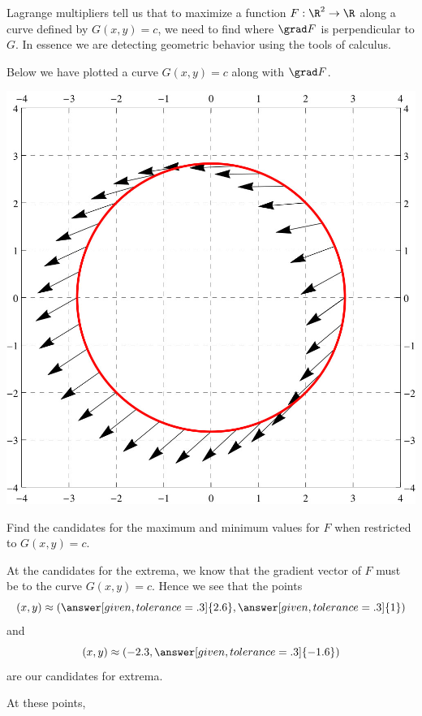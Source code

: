 \documentclass{ximera}
\begin{document}
Lagrange multipliers tell us that to maximize a function $F:\R^2\to\R$
along a curve defined by $G(x,y) = c$, we need to find where $\grad F$
is perpendicular to $G$. In essence we are detecting geometric
behavior using the tools of calculus.

\begin{example}
  Below we have plotted a curve $G(x,y) = c$ along with $\grad F$.
  \begin{image}
    \includegraphics{curveVectors2.jpg}
  \end{image}
  Find the candidates for the maximum and minimum values for $F$ when
  restricted to $G(x,y) = c$.
  \begin{explanation}
    At the candidates for the extrema, we know that the gradient
    vector of $F$ must be
     to
    the curve $G(x,y) = c$. Hence we see that the points
    \[
    (x,y)\approx\left(\answer[given,tolerance=.3]{2.6},\answer[given,tolerance=.3]{1}\right)
    \]
    and
    \[
    (x,y)\approx \left(-2.3,\answer[given,tolerance=.3]{-1.6}\right)
    \]
    are our candidates for extrema.
    \begin{feedback}[correct]
      At these points,
      \begin{image}

\end{image}
\end{feedback}
\end{explanation}
\end{example}
\end{document}
